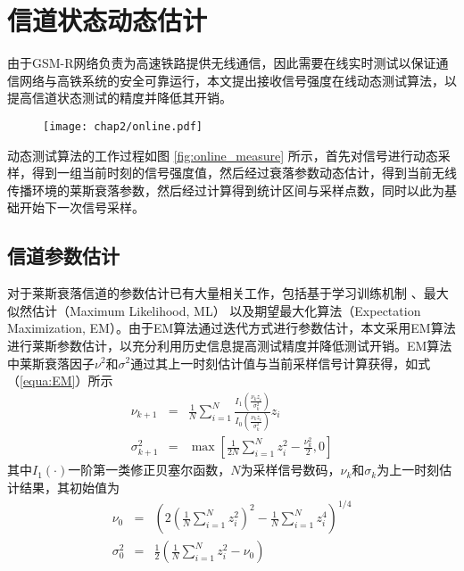 \section{信道状态动态估计}
\label{sec:dynamic}

由于GSM-R网络负责为高速铁路提供无线通信，因此需要在线实时测试以保证通信网络与高铁系统的安全可靠运行，本文提出接收信号强度在线动态测试算法，以提高信道状态测试的精度并降低其开销。

\begin{figure}[!htp]
\centering
\texttt{[image: chap2/online.pdf]}
\end{figure}

动态测试算法的工作过程如图 \ref{fig:online_measure} 所示，首先对信号进行动态采样，得到一组当前时刻的信号强度值，然后经过衰落参数动态估计，得到当前无线传播环境的莱斯衰落参数，然后经过计算得到统计区间与采样点数，同时以此为基础开始下一次信号采样。

\subsection{信道参数估计}
\label{sec:estimation}

对于莱斯衰落信道的参数估计已有大量相关工作，包括基于学习训练机制 \cite{bjornson2010framework}、最大似然估计（Maximum Likelihood, ML） \cite{sijbers1998maximum} 以及期望最大化算法（Expectation Maximization, EM）\cite{marzetta1995algorithm}。由于EM算法通过迭代方式进行参数估计，本文采用EM算法进行莱斯参数估计，以充分利用历史信息提高测试精度并降低测试开销。EM算法中莱斯衰落因子$\nu^2$和$\sigma^2$通过其上一时刻估计值与当前采样信号计算获得，如式（\ref{equa:EM}）所示
\begin{subequations}
  \begin{eqnarray}
    \nu_{k+1}&=&\frac{1}{N}\sum_{i=1}^{N}\frac{I_{1}\left(\frac{\nu_{k}z_{i}}{\sigma_k^2}\right)}{I_{0}\left(\frac{\nu_{k}z_{i}}{\sigma_k^2}\right)}z_i \\
    \sigma_{k+1}^2&=&\max{\left[\frac{1}{2N}\sum_{i=1}^N z_i^2 -\frac{\nu_k^2}{2},0\right]}
  \end{eqnarray}
\label{equa:EM}
\end{subequations}
其中$I_1(\cdot)$一阶第一类修正贝塞尔函数，$N$为采样信号数码，$\nu_k$和$\sigma_k$为上一时刻估计结果，其初始值为
\begin{subequations}
  \begin{eqnarray}
    \nu_{0}&=& \left(2\left(\frac{1}{N}\sum_{i=1}^N z_i^2\right)^2-\frac{1}{N}\sum_{i=1}^N z_i^4\right)^{1/4} \\
    \sigma_{0}^2&=&\frac{1}{2}\left(\frac{1}{N}\sum_{i=1}^N z_i^2 - \nu_{0}\right)
  \end{eqnarray}
\label{equa:EM0}
\end{subequations}


